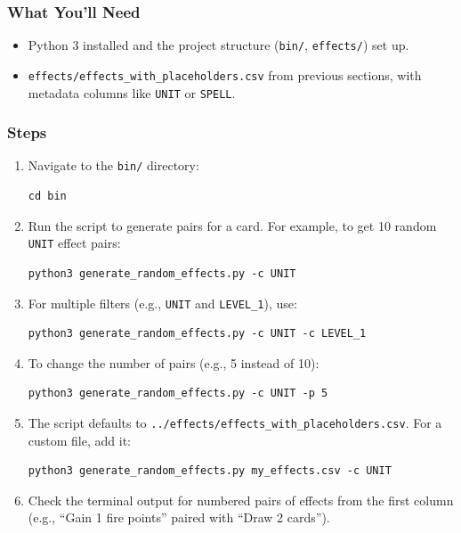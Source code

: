 \subsubsection{What You’ll Need}
\begin{itemize}
	\item Python 3 installed and the project structure (\texttt{bin/}, \texttt{effects/}) set up.
	\item \texttt{effects/effects\_with\_placeholders.csv} from previous sections, with metadata columns like \texttt{UNIT} or \texttt{SPELL}.
\end{itemize}

\subsubsection{Steps}
\begin{enumerate}
	\item Navigate to the \texttt{bin/} directory:
\begin{lstlisting}[style=terminalstyle]
cd bin
\end{lstlisting}
	\item Run the script to generate pairs for a card. For example, to get 10 random \texttt{UNIT} effect pairs:
\begin{lstlisting}[style=terminalstyle]
python3 generate_random_effects.py -c UNIT
\end{lstlisting}
	\item For multiple filters (e.g., \texttt{UNIT} and \texttt{LEVEL\_1}), use:
\begin{lstlisting}[style=terminalstyle]
python3 generate_random_effects.py -c UNIT -c LEVEL_1
\end{lstlisting}
	\item To change the number of pairs (e.g., 5 instead of 10):
\begin{lstlisting}[style=terminalstyle]
python3 generate_random_effects.py -c UNIT -p 5
\end{lstlisting}
	\item The script defaults to \texttt{../effects/effects\_with\_placeholders.csv}. For a custom file, add it:
\begin{lstlisting}[style=terminalstyle]
python3 generate_random_effects.py my_effects.csv -c UNIT
\end{lstlisting}
	\item Check the terminal output for numbered pairs of effects from the first column (e.g., ``Gain 1 fire points'' paired with ``Draw 2 cards'').
\end{enumerate}


